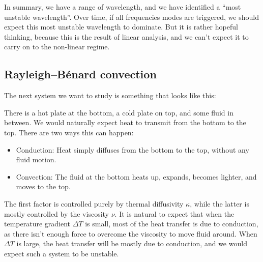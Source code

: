 \documentclass[a4paper]{article}
\begin{document}
In summary, we have a range of wavelength, and we have identified a ``most unstable wavelength''. Over time, if all frequencies modes are triggered, we should expect this most unstable wavelength to dominate. But it is rather hopeful thinking, because this is the result of linear analysis, and we can't expect it to carry on to the non-linear regime.

\subsection{Rayleigh--B\'enard convection}
The next system we want to study is something that looks like this:
\begin{center}
\end{center}
There is a hot plate at the bottom, a cold plate on top, and some fluid in between. We would naturally expect heat to transmit from the bottom to the top. There are two ways this can happen:
\begin{itemize}
  \item Conduction: Heat simply diffuses from the bottom to the top, without any fluid motion.
  \item Convection: The fluid at the bottom heats up, expands, becomes lighter, and moves to the top.
\end{itemize}
The first factor is controlled purely by thermal diffusivity $\kappa$, while the latter is mostly controlled by the viscosity $\nu$. It is natural to expect that when the temperature gradient $\Delta T$ is small, most of the heat transfer is due to conduction, as there isn't enough force to overcome the viscosity to move fluid around. When $\Delta T$ is large, the heat transfer will be mostly due to conduction, and we would expect such a system to be unstable.
\end{document}
